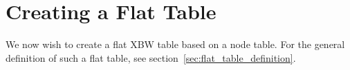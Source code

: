 \documentclass[a4paper,12pt,twoside,BCOR=10mm]{scrbook}
\begin{document}
%
%


\section{Creating a Flat Table}
%

We now wish to create a flat XBW table based on a node table. 
For the general definition of such a flat table, see section~\ref{sec:flat_table_definition}.
\end{document}

